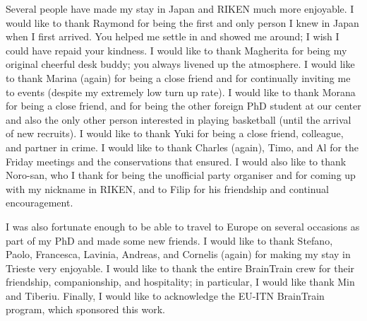 Several people have made my stay in Japan and RIKEN much more enjoyable. I would like to thank Raymond for being the first and only person I knew in Japan when I first arrived. You helped me settle in and showed me around; I wish I could have repaid your kindness. I would like to thank Magherita for being my original cheerful desk buddy; you always livened up the atmosphere. I would like to thank Marina (again) for being a close friend and for continually inviting me to events (despite my extremely low turn up rate). I would like to thank Morana for being a close friend, and for being the other foreign PhD student at our center and also the only other person interested in playing basketball (until the arrival of new recruits). I would like to thank Yuki for being a close friend, colleague, and partner in crime. I would like to thank Charles (again), Timo, and Al for the Friday meetings and the conservations that ensured. I would also like to thank Noro-san, who I thank for being the unofficial party organiser and for coming up with my nickname in RIKEN, and to Filip for his friendship and continual encouragement.

I was also fortunate enough to be able to travel to Europe on several occasions as part of my PhD and made some new friends. I would like to thank Stefano, Paolo, Francesca, Lavinia, Andreas, and Cornelis (again) for making my stay in Trieste very enjoyable. I would like to thank the entire BrainTrain crew for their friendship, companionship, and hospitality; in particular, I would like thank Min and Tiberiu. Finally, I would like to acknowledge the EU-ITN BrainTrain program, which sponsored this work.
